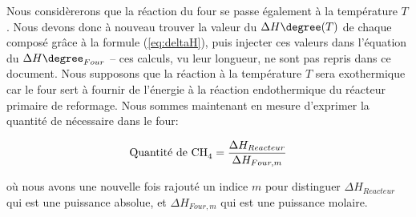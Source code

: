 Nous considèrerons que la réaction du four se passe également à la température $T$. 
Nous devons donc à nouveau trouver la valeur du $\Delta H\degree(T)$ de chaque composé grâce à la formule (\ref{eq:deltaH}),
puis injecter ces valeurs dans l'équation du $\Delta H\degree_{Four}$ -- ces calculs, vu leur longueur, ne sont pas repris dans
ce document. Nous supposons que la réaction à la température $T$ sera exothermique car le four sert à fournir de l'énergie à la réaction
endothermique du réacteur primaire de reformage. 
Nous sommes maintenant en mesure d'exprimer la quantité de  nécessaire dans le four:

$$\text{Quantité de \ce{CH_4}} = \dfrac{\Delta H_{Reacteur}}{\Delta H_{Four,m}}$$

où nous avons une nouvelle fois rajouté un indice $m$ pour distinguer $\Delta H_{Reacteur}$ qui est une puissance
absolue, et $\Delta H_{Four,m}$ qui est une puissance molaire.



